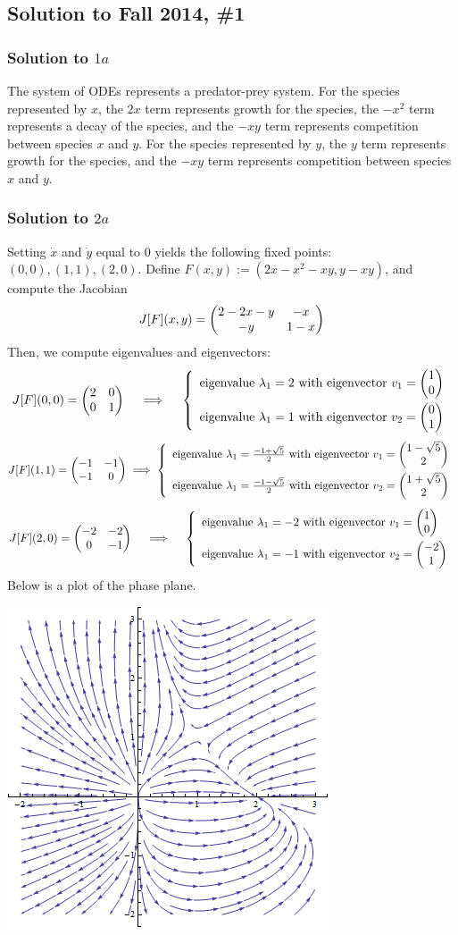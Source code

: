\subsection*{Solution to Fall 2014, \#1}
\label{F14Q1}

\subsubsection*{Solution to $1a$}

The system of ODEs represents a predator-prey system. For the species represented by $x$, the $2x$ term represents growth for the species, the $-x^2$ term represents a decay of the species, and the $-xy$ term represents competition between species $x$ and $y$. For the species represented by $y$, the $y$ term represents growth for the species, and the $-xy$ term represents competition between species $x$ and $y$.

\subsubsection*{Solution to $2a$}

Setting $\dot{x}$ and $\dot{y}$ equal to 0 yields the following fixed points: $(0,0), (1,1), (2,0)$. Define $F(x,y) := (2x-x^2-xy, y-xy)$, and compute the Jacobian
$$ J[F](x,y) = \begin{pmatrix} 2-2x-y & -x \\ -y & 1-x\end{pmatrix} $$
Then, we compute eigenvalues and eigenvectors:
$$ J[F](0,0) = \pmat{2}{0}{0}{1} \quad \implies \quad \evev{2}{1}{1}{0}{0}{1}$$
$$ J[F](1,1) = \pmat{-1}{-1}{-1}{0}  \implies\evev{\frac{-1+\sqrt{5}}{2}}{\frac{-1-\sqrt{5}}{2}}{1-\sqrt{5}}{2}{1+\sqrt{5}}{2} $$
$$ J[F](2,0) = \pmat{-2}{-2}{0}{-1}\quad \implies \quad \evev{-2}{-1}{1}{0}{-2}{1} $$
Below is a plot of the phase plane.

\begin{center}
\includegraphics[scale=0.75]{./_Figures/f141_ppp.png}
\end{center}

